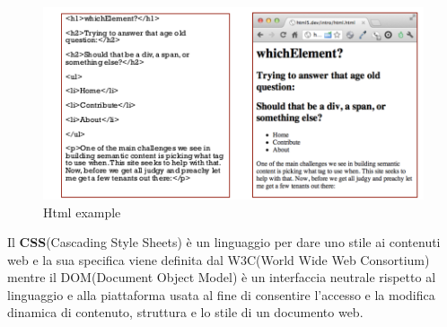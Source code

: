 \documentclass[a4paper,12pt, oneside]{book}
\begin{document}
\begin{figure}
    \caption{Html example}
    \label{listato:htmlExample}
	\includegraphics[scale=0.9]{img/html.png}
\end{figure}
Il \textbf{CSS}(Cascading Style Sheets) è un linguaggio per dare uno stile ai contenuti web e la sua specifica
viene definita dal W3C(World Wide Web Consortium) mentre il DOM(Document Object Model) è un interfaccia
neutrale rispetto al linguaggio e alla piattaforma usata al fine di consentire l'accesso e la modifica 
dinamica di contenuto, struttura e lo stile di un documento web.
\end{document}
